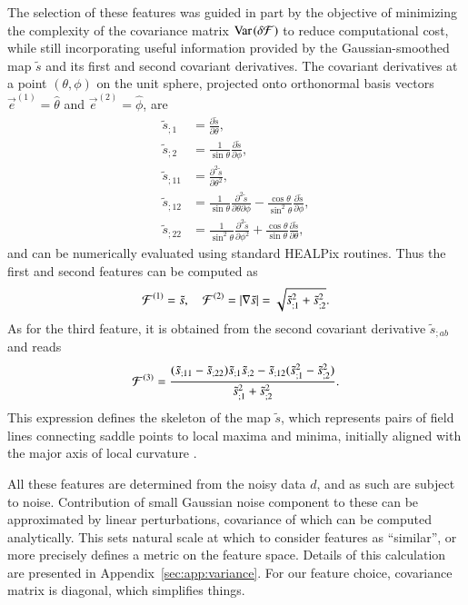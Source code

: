 \documentclass{aa}
\newcommand{\var}[1]{{\textrm{Var}\;\!(#1)}}
\begin{document}
The selection of these features was guided in part by the objective of minimizing the complexity of the covariance matrix $\var{\delta\cal F}$ to reduce computational cost, while still incorporating useful information provided by the Gaussian-smoothed map $\tilde{s}$ and its first and second covariant derivatives. The covariant derivatives at a point $(\theta,\phi)$ on the unit sphere, projected onto orthonormal basis vectors $\vec{e}^{(1)} = \hat{\theta}$ and $\vec{e}^{(2)} = \hat{\phi}$, are
%
\begin{equation}
\begin{aligned}
    \tilde{s}_{;1}&=\frac{\partial\tilde{s}}{\partial\theta} , \\
    \tilde{s}_{;2}&=\frac{1}{\sin\theta}\frac{\partial\tilde{s}}{\partial\phi} , \\
    \tilde{s}_{;11}&=\frac{\partial^{2}\tilde{s}}{\partial\theta^{2}} , \\
    \tilde{s}_{;12}&=\frac{1}{\sin\theta}\frac{\partial^{2}\tilde{s}}{\partial\theta\partial\phi}-\frac{\cos\theta}{\sin^{2}\theta}\frac{\partial\tilde{s}}{\partial\phi} , \\
    \tilde{s}_{;22}&=\frac{1}{\sin^{2}\theta}\frac{\partial^{2}\tilde{s}}{\partial\phi^{2}}+\frac{\cos\theta}{\sin\theta}\frac{\partial\tilde{s}}{\partial\theta} ,
    \end{aligned}
\end{equation}
and can be numerically evaluated using standard HEALPix routines. Thus the first and second features can be computed as 
%
\begin{equation} \label{eq:feature:12}
  {\cal F}^{(1)} = \tilde{s}, \hspace{1em}
  {\cal F}^{(2)} = |\nabla\tilde{s}| = \sqrt{\tilde{s}_{;1}^2 + \tilde{s}_{;2}^2} .
\end{equation}
%
As for the third feature, it is obtained from the second covariant derivative $\tilde{s}_{;ab}$ and reads
%
\begin{equation} \label{eq:feature:3}
  {\cal F}^{(3)} = \frac{(\tilde{s}_{;11}-\tilde{s}_{;22}) \tilde{s}_{;1} \tilde{s}_{;2} - \tilde{s}_{;12}(\tilde{s}_{;1}^2 - \tilde{s}_{;2}^2)}{\tilde{s}_{;1}^2 + \tilde{s}_{;2}^2} .
\end{equation}
%
This expression defines the skeleton of the map $\tilde{s}$, which represents pairs of field lines connecting saddle points to local maxima and minima, initially aligned with the major axis of local curvature \citep{2006MNRAS.366.1201N}.

All these features are determined from the noisy data $d$, and as such are subject to noise. Contribution of small Gaussian noise component to these can be approximated by linear perturbations, covariance of which can be computed analytically. This sets natural scale at which to consider features as ``similar'', or more precisely defines a metric on the feature space. Details of this calculation are presented in Appendix~\ref{sec:app:variance}. For our feature choice, covariance matrix is diagonal, which simplifies things.
\end{document}
